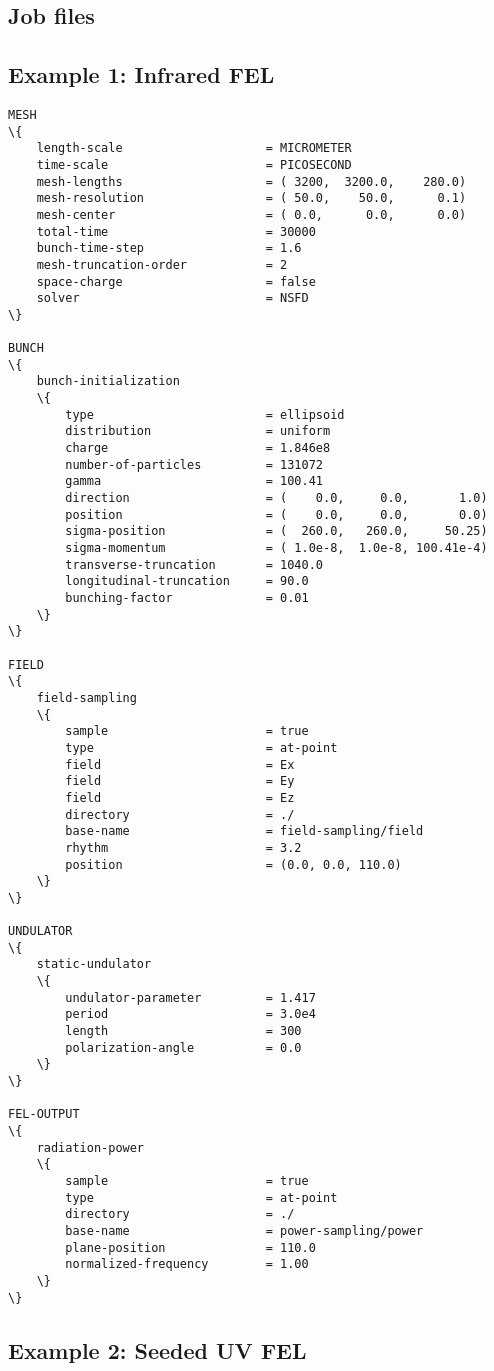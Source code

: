\begin{appendices}
\chapter{Job files}
\label{job_files}

\section{Example 1: Infrared FEL}
\label{job_file_1}

\begin{snugshade}
\begin{Verbatim}[fontsize=\footnotesize, tabsize=4, fontfamily=courier, fontseries=b, commandchars=\\\{\}, obeytabs]
MESH
\{
	length-scale					= MICROMETER
	time-scale						= PICOSECOND
	mesh-lengths					= ( 3200,  3200.0,    280.0)
	mesh-resolution					= ( 50.0,    50.0,      0.1)
	mesh-center						= ( 0.0,      0.0,      0.0)
	total-time						= 30000
	bunch-time-step					= 1.6
	mesh-truncation-order			= 2
	space-charge					= false
	solver							= NSFD
\}
	
BUNCH
\{
	bunch-initialization
	\{
		type						= ellipsoid
		distribution				= uniform
		charge						= 1.846e8
		number-of-particles			= 131072
		gamma						= 100.41
		direction					= (    0.0,     0.0,       1.0)
		position					= (    0.0,     0.0,       0.0)
		sigma-position				= (  260.0,   260.0,     50.25)
		sigma-momentum				= ( 1.0e-8,  1.0e-8, 100.41e-4)
		transverse-truncation		= 1040.0
		longitudinal-truncation		= 90.0
		bunching-factor				= 0.01
	\}
\}
	
FIELD
\{
	field-sampling
	\{
		sample						= true
		type						= at-point
		field						= Ex
		field						= Ey
		field						= Ez
		directory					= ./
		base-name					= field-sampling/field
		rhythm						= 3.2
		position					= (0.0, 0.0, 110.0)
	\}
\}
	
UNDULATOR
\{
	static-undulator
	\{
		undulator-parameter			= 1.417
		period						= 3.0e4
		length						= 300
		polarization-angle			= 0.0
	\}
\}
	
FEL-OUTPUT
\{
	radiation-power
	\{
		sample						= true
		type						= at-point
		directory					= ./
		base-name					= power-sampling/power
		plane-position				= 110.0
		normalized-frequency		= 1.00
	\}
\}
\end{Verbatim}
\end{snugshade}

\section{Example 2: Seeded UV FEL}
\label{job_file_2}


\end{appendices}
